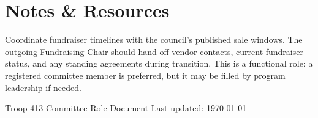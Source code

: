 \documentclass[11pt, letterpaper]{article}
\begin{document}
\vspace{0.6em}

\section{Notes \& Resources}
Coordinate fundraiser timelines with the council's published sale windows. The outgoing Fundraising Chair should hand off vendor contacts, current fundraiser status, and any standing agreements during transition. This is a functional role: a registered committee member is preferred, but it may be filled by program leadership if needed.

\vfill
\begin{center}
  \footnotesize\color{gray}
  Troop 413 \textbullet{} Committee Role Document \textbullet{} Last updated: \today
\end{center}
\end{document}
